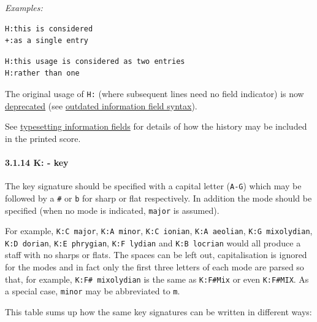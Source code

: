 \documentclass[oneside]{book}
\let\oldparagraph\paragraph
\renewcommand{\paragraph}[1]{\oldparagraph{#1}\mbox{}}
\begin{document}
\emph{Examples:}

\begin{verbatim}
H:this is considered
+:as a single entry
\end{verbatim}

\begin{verbatim}
H:this usage is considered as two entries
H:rather than one
\end{verbatim}

The original usage of \texttt{H:} (where subsequent lines need no field
indicator) is now \protect\hyperlink{outdated_syntax}{deprecated} (see
\protect\hyperlink{outdated_information_field_syntax}{outdated
information field syntax}).

See \protect\hyperlink{typesetting_information_fields}{typesetting
information fields} for details of how the history may be included in
the printed score.

\hypertarget{kkey}{\paragraph{3.1.14 K: - key}\label{kkey}}

The key signature should be specified with a capital letter
(\texttt{A-G}) which may be followed by a \texttt{\#} or \texttt{b} for
sharp or flat respectively. In addition the mode should be specified
(when no mode is indicated, \texttt{major} is assumed).

For example, \texttt{K:C\ major}, \texttt{K:A\ minor},
\texttt{K:C\ ionian}, \texttt{K:A\ aeolian}, \texttt{K:G\ mixolydian},
\texttt{K:D\ dorian}, \texttt{K:E\ phrygian}, \texttt{K:F\ lydian} and
\texttt{K:B\ locrian} would all produce a staff with no sharps or flats.
The spaces can be left out, capitalisation is ignored for the modes and
in fact only the first three letters of each mode are parsed so that,
for example, \texttt{K:F\#\ mixolydian} is the same as \texttt{K:F\#Mix}
or even \texttt{K:F\#MIX}. As a special case, \texttt{minor} may be
abbreviated to \texttt{m}.

This table sums up how the same key signatures can be written in
different ways:
\end{document}
